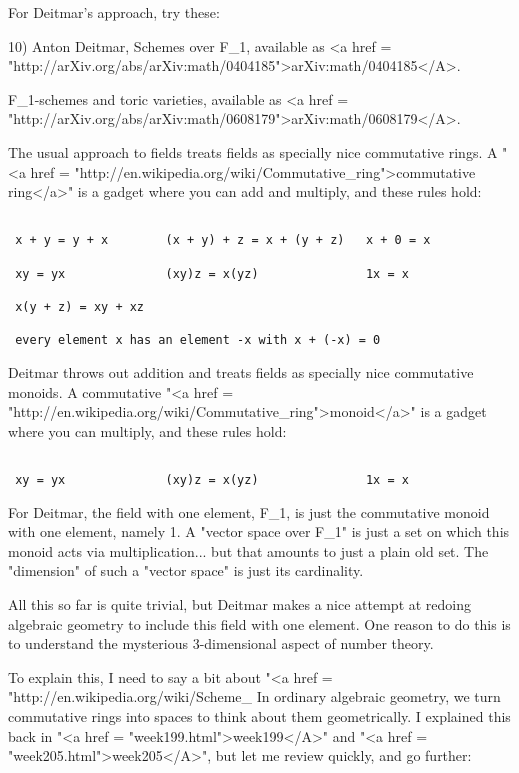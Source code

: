 For Deitmar's approach, try these:

10) Anton Deitmar, Schemes over F_{1}, available as <a href = "http://arXiv.org/abs/arXiv:math/0404185">arXiv:math/0404185</A>.

F_{1}-schemes and toric varieties, available as <a href = "http://arXiv.org/abs/arXiv:math/0608179">arXiv:math/0608179</A>.

The usual approach to fields treats fields as specially nice
commutative rings.  A "<a href =
"http://en.wikipedia.org/wiki/Commutative_ring">commutative
ring</a>" is a gadget where you can add and multiply, and these
rules hold:


\begin{verbatim}

 x + y = y + x        (x + y) + z = x + (y + z)   x + 0 = x

 xy = yx              (xy)z = x(yz)               1x = x

 x(y + z) = xy + xz 

 every element x has an element -x with x + (-x) = 0
\end{verbatim}
    

Deitmar throws out addition and treats fields as specially nice
commutative monoids.  A commutative "<a href =
"http://en.wikipedia.org/wiki/Commutative_ring">monoid</a>" is a gadget where you can multiply, and these rules
hold:


\begin{verbatim}

 xy = yx              (xy)z = x(yz)               1x = x
\end{verbatim}
    

For Deitmar, the field with one element, F_{1}, is just the
commutative monoid with one element, namely 1.  A "vector space
over F_{1}" is just a set on which this monoid acts via
multiplication... but that amounts to just a plain old set.  The
"dimension" of such a "vector space" is just its
cardinality.

All this so far is quite trivial, but Deitmar makes a nice attempt at 
redoing algebraic geometry to include this field with one element.  
One reason to do this is to understand the mysterious 3-dimensional
aspect of number theory.  

To explain this, I need to say a bit about "<a href =
"http://en.wikipedia.org/wiki/Scheme_%
In ordinary algebraic geometry, we turn commutative rings into spaces
to think about them geometrically.  I explained this back in "<a
href = "week199.html">week199</A>" and "<a href =
"week205.html">week205</A>", but let me review quickly, and go
further:

